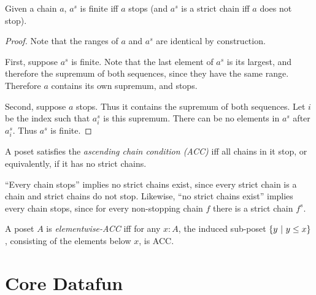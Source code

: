 \documentclass{article}
\begin{document}
\begin{lemma}
  Given a chain $a$, $a^s$ is finite iff $a$ stops (and $a^s$ is a strict chain
  iff $a$ does not stop).
\end{lemma}
\begin{proof}
  Note that the ranges of $a$ and $a^s$ are identical by construction.

  First, suppose $a^s$ is finite. Note that the last element of $a^s$ is its
  largest, and therefore the supremum of both sequences, since they have the
  same range. Therefore $a$ contains its own supremum, and stops.

  Second, suppose $a$ stops. Thus it contains the supremum of both sequences.
  Let $i$ be the index such that $a^s_i$ is this supremum. There can be no
  elements in $a^s$ after $a^s_i$. Thus $a^s$ is finite.
\end{proof}

\begin{definition}[ACC]
  A poset satisfies the \emph{ascending chain condition (ACC)} iff all chains in
  it stop, or equivalently, if it has no strict chains.
\end{definition}

``Every chain stops'' implies no strict chains exist, since every strict chain
is a chain and strict chains do not stop. Likewise, ``no strict chains exist''
implies every chain stops, since for every non-stopping chain $f$ there is a
strict chain $f^s$.

\begin{definition}
  A poset $A$ is \emph{elementwise-ACC} iff for any $x : A$, the induced
  sub-poset $\{{{y}~|~{y \le x}}\}$, consisting of the elements below $x$, is ACC.
\end{definition}



\section{Core Datafun}

\end{document}
